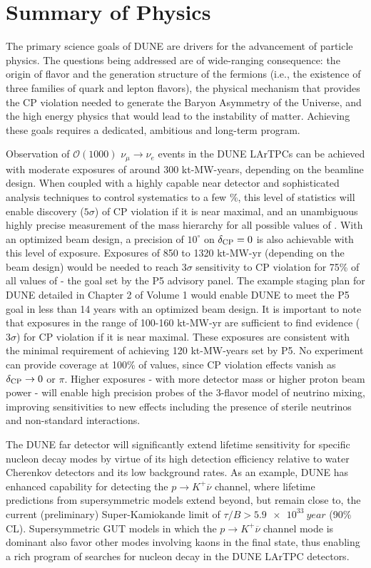 
\chapter{Summary of Physics}
\label{ch:physics-summary}

The primary science goals of DUNE are drivers for the advancement of
particle physics. The questions being addressed are of wide-ranging
consequence: the origin of flavor and the generation structure of the
fermions (i.e., the existence of three families of quark and lepton
flavors), the physical mechanism that provides the CP violation needed
to generate the Baryon Asymmetry of the Universe, and the high energy
physics that would lead to the instability of matter.  Achieving these
goals requires a dedicated, ambitious and long-term program. 

Observation of $\mathcal{O}(1000)$ $\nu_\mu \rightarrow \nu_e$ events
in the DUNE LArTPCs can be achieved with moderate exposures of around
300 kt-MW-years, depending on the beamline design. When coupled with a
highly capable near detector and sophisticated analysis techniques to
control systematics to a few \%, this level of statistics will enable
discovery ($5\sigma$) of CP violation if it is near maximal, and an
unambiguous highly precise measurement of the mass hierarchy for all
possible values of \deltacp. With an optimized beam design, a
precision of $10^\circ$ on $\delta_{\rm CP} = 0$ is also achievable
with this level of exposure.  Exposures of 850 to 1320 kt-MW-yr
(depending on the beam design) would be needed to reach $3\sigma$
sensitivity to CP violation for 75\% of all values of \deltacp - the
goal set by the P5 advisory panel. The example staging plan for DUNE
detailed in Chapter 2 of Volume 1 would enable DUNE to meet the P5
goal in less than 14 years with an optimized beam design. It is
important to note that exposures in the range of 100-160 kt-MW-yr are
sufficient to find evidence ($3 \sigma$) for CP violation if it is
near maximal. These exposures are consistent with the minimal
requirement of achieving 120 kt-MW-years set by P5. No experiment can
provide coverage at 100\% of \deltacp values, since CP violation
effects vanish as $\mdeltacp\to 0$ or $\pi$. Higher exposures - with
more detector mass or higher proton beam power - will enable high
precision probes of the 3-flavor model of neutrino mixing, improving
sensitivities to new effects including the presence of sterile
neutrinos and non-standard interactions.

The DUNE far detector will significantly extend lifetime sensitivity
for specific nucleon decay modes by virtue of its high detection
efficiency relative to water Cherenkov detectors and its low
background rates.  As an example, DUNE has enhanced capability for
detecting the $p\to K^+\overline{\nu}$ channel, where lifetime
predictions from supersymmetric models extend beyond, but remain close
to, the current (preliminary) Super-Kamiokande limit of $\tau/B >
\SI{5.9e33}{year}$ (90\% CL). Supersymmetric GUT models in which
the $p\to K^+\overline{\nu}$ channel mode is dominant also favor
other modes involving kaons in the final state, thus enabling a rich 
program of searches for nucleon decay in the DUNE LArTPC detectors.

